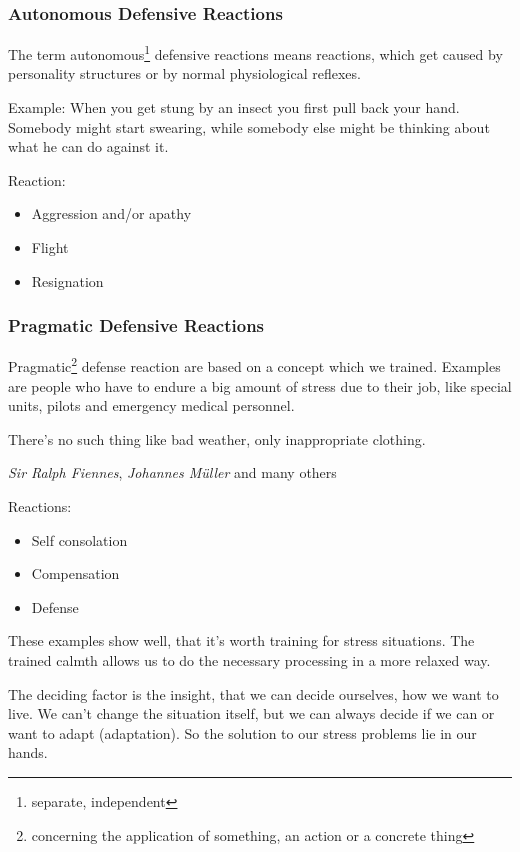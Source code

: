 \documentclass[../main.tex]{subfiles}
\begin{document}
\subsubsection{Autonomous Defensive Reactions}
The term autonomous\footnote{separate, independent} defensive reactions means reactions, which get caused by personality structures or by normal physiological reflexes.

Example: When you get stung by an insect you first pull back your hand. Somebody might start swearing, while somebody else might be thinking about what he can do against it.

Reaction:

  \begin{itemize}
  \item Aggression and/or apathy
  \item Flight
    \item Resignation
    \end{itemize}

    \subsubsection{Pragmatic Defensive Reactions}

    Pragmatic\footnote{concerning the application of something, an action or a concrete thing} defense reaction are based on a concept which we trained. Examples are people who have to endure a big amount of stress due to their job, like special units, pilots and emergency medical personnel.

    \epigraph{There's no such thing like bad weather, only inappropriate clothing.}{\textit{Sir Ralph Fiennes}, \textit{Johannes M\"uller} and many others}

    Reactions:
    
    \begin{itemize}
    \item Self consolation
    \item Compensation
     \item Defense
    \end{itemize}

    These examples show well, that it's worth training for stress situations. The trained calmth allows us to do the necessary processing in a more relaxed way.

The deciding factor is the insight, that we can decide ourselves, how we want to live. We can't change the situation itself, but we can always decide if we can or want to adapt (adaptation). So the solution to our stress problems lie in our hands.
    
\end{document}
